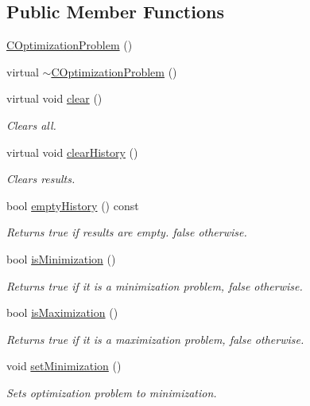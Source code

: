 \subsection*{Public Member Functions}
\begin{DoxyCompactItemize}
\item 
\hyperlink{class_c_optimization_problem_aa0a4b0429250454fdf87722ed36d98d5}{C\-Optimization\-Problem} ()
\item 
virtual \hyperlink{class_c_optimization_problem_afd552fd41afa6355dd5e1d8b72b79739}{$\sim$\-C\-Optimization\-Problem} ()
\item 
virtual void \hyperlink{class_c_optimization_problem_a59a36304309b79f0dc7be25638016ee0}{clear} ()
\begin{DoxyCompactList}\small\item\em Clears all. \end{DoxyCompactList}\item 
virtual void \hyperlink{class_c_optimization_problem_a405d5e1e0008ba9e8604327632e93cbe}{clear\-History} ()
\begin{DoxyCompactList}\small\item\em Clears results. \end{DoxyCompactList}\item 
bool \hyperlink{class_c_optimization_problem_a9b2dfd8207421acd7e51b45d4d512400}{empty\-History} () const 
\begin{DoxyCompactList}\small\item\em Returns true if results are empty. false otherwise. \end{DoxyCompactList}\item 
bool \hyperlink{class_c_optimization_problem_a6e087d18a2bafd52881272c07be0b030}{is\-Minimization} ()
\begin{DoxyCompactList}\small\item\em Returns true if it is a minimization problem, false otherwise. \end{DoxyCompactList}\item 
bool \hyperlink{class_c_optimization_problem_a1986507efbe70517b0f4fb470f80558a}{is\-Maximization} ()
\begin{DoxyCompactList}\small\item\em Returns true if it is a maximization problem, false otherwise. \end{DoxyCompactList}\item 
void \hyperlink{class_c_optimization_problem_a165b7a6584eb085ae51edae5f7dbca13}{set\-Minimization} ()
\begin{DoxyCompactList}\small\item\em Sets optimization problem to minimization. \end{DoxyCompactList}\item 

\end{DoxyCompactItemize}
